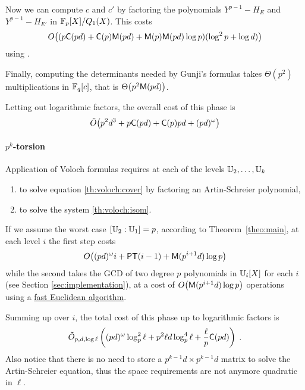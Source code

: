 Now we can compute $c$ and $c'$ by factoring the polynomials
$Y^{p-1}-H_E$ and $Y^{p-1}-H_{E'}$ in $\mathbb{F}_p[X]/Q_1(X)$. This costs
\[O\bigl((p\mathsf{C}(pd) + \mathsf{C}(p)\mathsf{M}(pd) + \mathsf{M}(p)\mathsf{M}(pd)\log
p)(\log^2 p+\log d)\bigr)\] using \cite[Section 3]{kaltofen+shoup97}.

Finally, computing the determinants needed by Gunji's formulas takes
$\Theta(p^2)$ multiplications in $\mathbb{F}_q[c]$, that is
$\Theta\bigl(p^2\mathsf{M}(pd)\bigr)$.

Letting out logarithmic factors, the overall cost of this phase is
\begin{equation}
  \label{eq:gunji-complexity}
  \tilde{O}\bigl(p^2d^3 + p\mathsf{C}(pd) + \mathsf{C}(p)pd + (pd)^\omega \bigr)
\end{equation}


\paragraph{$p^k$-torsion}
Application of Voloch formulas requires at each of the levels
$\mathbb{U}_2,\ldots,\mathbb{U}_k$
\begin{enumerate}
\item to solve equation \eqref{th:voloch:cover} by factoring an
  Artin-Schreier polynomial,
\item to solve the system \eqref{th:voloch:isom}.
\end{enumerate}
If we assume the worst case $[\mathbb{U}_2:\mathbb{U}_1] = p$, according to
Theorem~\ref{theo:main}, at each level $i$ the first step costs
\begin{equation*}
  O\bigl((pd)^\omega i + {\mathsf{PT}}(i-1) + \mathsf{M}(p^{i+1}d)\log p\bigr)
\end{equation*}
while the second takes the GCD of two degree $p$ polynomials in
$\mathbb{U}_i[X]$ for each $i$ (see Section \ref{sec:implementation}), at a
cost of $O\bigl(\mathsf{M}(p^{i+1}d)\log p\bigr)$ operations using a
\hyperref[sec:eucl-algor-rati]{fast Euclidean algorithm}.

Summing up over $i$, the total cost of this phase up to logarithmic
factors is
\begin{equation}
  \label{eq:C2-AS:complexity:p^k}
  \tilde{O}_{p,d,\log\ell}\left((pd)^\omega \log_p^2\ell + p^2\ell d\log_p^4\ell +
  \frac{\ell}{p}\mathsf{C}(pd)\right)
  \;\text{.}  
\end{equation}
Also notice that there is no need to store a $p^{k-1}d\times p^{k-1}d$
matrix to solve the Artin-Schreier equation, thus the space
requirements are not anymore quadratic in $\ell$.


